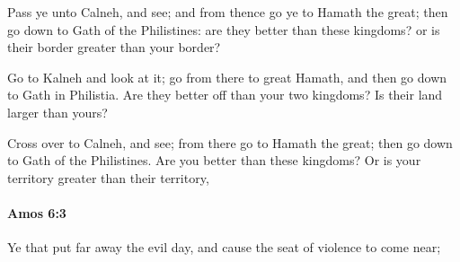 			\begin{versebox}
					\item[BHS] 
					\item[LXX] 
					\item[ASV] Pass ye unto Calneh, and see; and from thence go ye to Hamath the great; then go down to Gath of the Philistines: are they better than these kingdoms? or is their border greater than your border?
					\item[NIV] Go to Kalneh and look at it; go from there to great Hamath, and then go down to Gath in Philistia. Are they better off than your two kingdoms? Is their land larger than yours?
					\item[NRSV] Cross over to Calneh, and see; from there go to Hamath the great; then go down to Gath of the Philistines. Are you better than these kingdoms? Or is your territory greater than their territory,
			\end{versebox}

		\paragraph{Amos 6:3} %
			\label{AMOS-6-3}

			Ye that put far away the evil day, and cause the seat of violence to come near;

